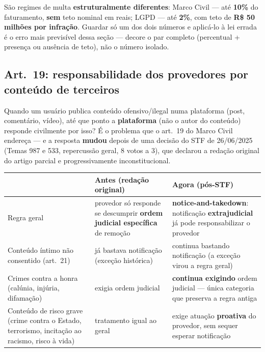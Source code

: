\begin{cuidado}
São regimes de multa \textbf{estruturalmente diferentes}: Marco Civil ---
até \textbf{10\%} do faturamento, \textbf{sem} teto nominal em reais; LGPD
--- até \textbf{2\%}, com teto de \textbf{R\$ 50 milhões por infração}.
Guardar só um dos dois números e aplicá-lo à lei errada é o erro mais
previsível dessa seção --- decore o par completo (percentual + presença
ou ausência de teto), não o número isolado.
\end{cuidado}

\subsection{Art.\ 19: responsabilidade dos provedores por conteúdo de terceiros}

\begin{conceito}
Quando um usuário publica conteúdo ofensivo/ilegal numa plataforma
(post, comentário, vídeo), até que ponto a \textbf{plataforma} (não o
autor do conteúdo) responde civilmente por isso? É o problema que o art.\
19 do Marco Civil endereça --- e a resposta \textbf{mudou} depois de uma
decisão do STF de 26/06/2025 (Temas 987 e 533, repercussão geral, 8 votos
a 3), que declarou a redação original do artigo parcial e
progressivamente inconstitucional.
\end{conceito}

\begin{center}
\begin{tabular}{@{}p{3cm}p{4.6cm}p{4.6cm}@{}}
\toprule
& \textbf{Antes (redação original)} & \textbf{Agora (pós-STF)} \\
\midrule
Regra geral & provedor só responde se descumprir \textbf{ordem judicial
específica} de remoção & \textbf{notice-and-takedown}: notificação
\textbf{extrajudicial} já pode responsabilizar o provedor \\
Conteúdo íntimo não consentido (art.\ 21) & já bastava notificação
(exceção histórica) & continua bastando notificação (a exceção virou a
regra geral) \\
Crimes contra a honra (calúnia, injúria, difamação) & exigia ordem
judicial & \textbf{continua exigindo} ordem judicial --- única categoria
que preserva a regra antiga \\
Conteúdo de risco grave (crime contra o Estado, terrorismo, incitação ao
racismo, risco à vida) & tratamento igual ao geral & exige atuação
\textbf{proativa} do provedor, sem sequer esperar notificação \\
\bottomrule
\end{tabular}
\end{center}

